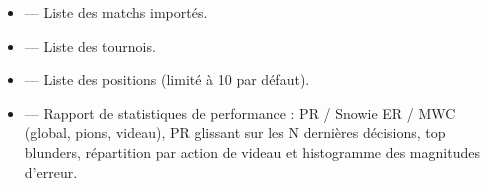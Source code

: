 \documentclass[letterpaper,10pt,french]{sphinxmanual}
\begin{document}
\sphinxAtStartPar
{}
\begin{itemize}
\item {} 
\sphinxAtStartPar
{} — Liste des matchs importés.

\item {} 
\sphinxAtStartPar
{} — Liste des tournois.

\item {} 
\sphinxAtStartPar
{} — Liste des positions (limité à 10 par défaut).

\item {} 
\sphinxAtStartPar
{} — Rapport de statistiques de performance : PR / Snowie ER / MWC
(global, pions, videau), PR glissant sur les N dernières décisions, top
blunders, répartition par action de videau et histogramme des magnitudes
d’erreur.

\end{itemize}
\end{document}
